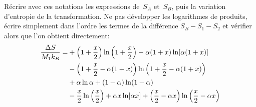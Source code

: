 \documentclass[utf8, 11pt]{feuille}
\begin{document}
\question
Récrire avec ces notations les expressions de~$S_A$ et~$S_B$, puis la
variation d'entropie de la transformation. Ne pas développer les
logarithmes de produits, écrire simplement dans l'ordre les termes de la
différence $S_B - S_1 - S_2$ et vérifier alors que l'on obtient
directement:
\begin{align*}
{ \Delta S \over M_1 k_B} = &+ \left( 1 + {x\over 2} \right) \ln\left( 1
  + {x\over 2} \right) - \alpha (1+x) \ln [\alpha (1+x)] \\
  & -\left( 1 + {x\over 2} - \alpha(1+x) \right)
          \ln\left(1+ {x\over 2} - \alpha(1+x) \right) \\
          &+ \alpha \ln\alpha + (1-\alpha) \ln (1-\alpha) \\
          &- {x\over 2} \ln \left( {x\over 2} \right) + \alpha x \ln[\alpha x]
          + \left( {x\over 2} -\alpha x\right) \ln \left( {x\over 2}
          - \alpha x \right)
\end{align*}
\end{document}

